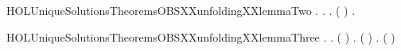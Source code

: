 \newcommand{\HOLUniqueSolutionsTheoremsOBSXXunfoldingXXlemmaOne}{\UseVerbatim{HOLUniqueSolutionsTheoremsOBSXXunfoldingXXlemmaOne}}
\begin{SaveVerbatim}{HOLUniqueSolutionsTheoremsOBSXXunfoldingXXlemmaTwo}
\HOLTokenTurnstile{} \HOLSymConst{\HOLTokenForall{}}.
         \HOLSymConst{\HOLTokenImp{}}
       \HOLSymConst{\HOLTokenForall{}}  .
             \HOLTokenTransBegin{}\HOLTokenTransEnd {} \HOLSymConst{\HOLTokenImp{}}
           \HOLSymConst{\HOLTokenExists{}}.   \HOLSymConst{\HOLTokenConj{}} ( \HOLSymConst{=}  ) \HOLSymConst{\HOLTokenConj{}} \HOLSymConst{\HOLTokenForall{}}.   \HOLTokenTransBegin{}\HOLTokenTransEnd {} 
\end{SaveVerbatim}
\newcommand{\HOLUniqueSolutionsTheoremsOBSXXunfoldingXXlemmaTwo}{\UseVerbatim{HOLUniqueSolutionsTheoremsOBSXXunfoldingXXlemmaTwo}}
\begin{SaveVerbatim}{HOLUniqueSolutionsTheoremsOBSXXunfoldingXXlemmaThree}
\HOLTokenTurnstile{} \HOLSymConst{\HOLTokenForall{}} .
         \HOLSymConst{\HOLTokenConj{}}   \HOLSymConst{\HOLTokenImp{}}
       \HOLSymConst{\HOLTokenForall{}}  .
            ( ) \HOLTokenTransBegin{}\HOLTokenTransEnd {} \HOLSymConst{\HOLTokenImp{}}
           \HOLSymConst{\HOLTokenExists{}}.   \HOLSymConst{\HOLTokenConj{}} ( \HOLSymConst{=}  ) \HOLSymConst{\HOLTokenConj{}} \HOLSymConst{\HOLTokenForall{}}.  ( ) \HOLTokenTransBegin{}\HOLTokenTransEnd {} 
\end{SaveVerbatim}
\newcommand{\HOLUniqueSolutionsTheoremsOBSXXunfoldingXXlemmaThree}{\UseVerbatim{HOLUniqueSolutionsTheoremsOBSXXunfoldingXXlemmaThree}}
